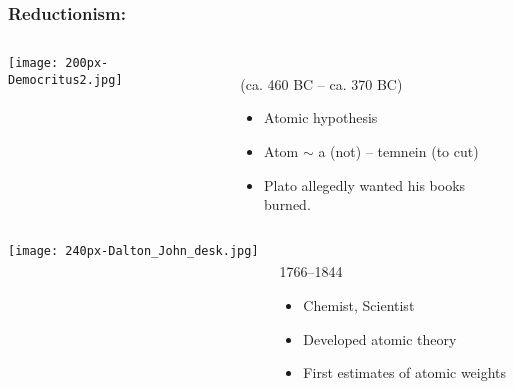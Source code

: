 \begin{frame}
  \frametitle{Reductionism:}

  \begin{columns}
    \texttt{[image: 200px-Democritus2.jpg]}\\
    \begin{block}{
    \\
    (ca. 460 BC -- ca. 370 BC)
  }
    \begin{itemize}
    \item 
      Atomic hypothesis
    \item 
      Atom $\sim$ a (not) -- temnein (to cut)
    \item 
      Plato allegedly wanted his books burned.
    \end{itemize}
    \end{block}
  \end{columns}

  \medskip

  \begin{columns}
    \texttt{[image: 240px-Dalton\_John\_desk.jpg]}\\
    \begin{block}{
        \\
        1766--1844
      }
      \begin{itemize}
    \item 
      Chemist, Scientist
    \item 
      Developed atomic theory
    \item 
      First estimates of atomic weights
    \end{itemize}
    \end{block}
  \end{columns}

\end{frame}

